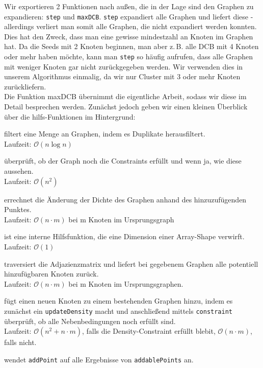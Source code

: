 \documentclass[a4paper]{scrartcl}
\begin{document}
Wir exportieren 2 Funktionen nach außen, die in der Lage sind den Graphen zu expandieren: \texttt{step} und \texttt{maxDCB}. \texttt{step} expandiert alle Graphen und liefert diese - allerdings verliert man somit alle Graphen, die nicht expandiert werden konnten. Dies hat den Zweck, dass man eine gewisse mindestzahl an Knoten im Graphen hat. Da die Seeds mit 2 Knoten beginnen, man aber z.\,B. alle DCB mit 4 Knoten oder mehr haben möchte, kann man \texttt{step} so häufig aufrufen, dass alle Graphen mit weniger Knoten gar nicht zurückgegeben werden. Wir verwenden dies in unserem Algorithmus einmalig, da wir nur Cluster mit 3 oder mehr Knoten zurückliefern.\\
\medskip
Die Funktion maxDCB übernimmt die eigentliche Arbeit, sodass wir diese im Detail besprechen werden. Zunächst jedoch geben wir einen kleinen Überblick über die hilfs-Funktionen im Hintergrund:
\begin{description}[style=multiline,leftmargin=2.75cm,font=\bfseries]
 \item[filterLayer] filtert eine Menge an Graphen, indem es Duplikate herausfiltert. \\ Laufzeit: $\mathcal{O}(n \log n)$
 \item[constraint] überprüft, ob der Graph noch die Constraints erfüllt und wenn ja, wie diese aussehen. \\ Laufzeit: $\mathcal{O}(n^2)$
 \item[updateDensity] errechnet die Änderung der Dichte des Graphen anhand des hinzuzufügenden Punktes. \\ Laufzeit: $\mathcal{O}(n \cdot m)$ bei m Knoten im Ursprungsgraph
 \item[reduceDim] ist eine interne Hilfsfunktion, die eine Dimension einer Array-Shape verwirft. \\ Laufzeit: $\mathcal{O}(1)$
 \item[addablePoints] traversiert die Adjazienzmatrix und liefert bei gegebenem Graphen alle potentiell hinzufügbaren Knoten zurück. \\ Laufzeit: $\mathcal{O}(n \cdot m)$ bei m Knoten im Ursprungsgraphen.
 \item[addPoint] fügt einen neuen Knoten zu einem bestehenden Graphen hinzu, indem es zunächst ein \texttt{updateDensity} macht und anschließend mittels \texttt{constraint} überprüft, ob alle Nebenbedingungen noch erfüllt sind. \\ Laufzeit: $\mathcal{O}(n^2 + n \cdot m)$, falls die Density-Constraint erfüllt blebit, $\mathcal{O}(n \cdot m)$, falls nicht.
 \item[expand] wendet \texttt{addPoint} auf alle Ergebnisse von \texttt{addablePoints} an.
\end{description}
\end{document}

